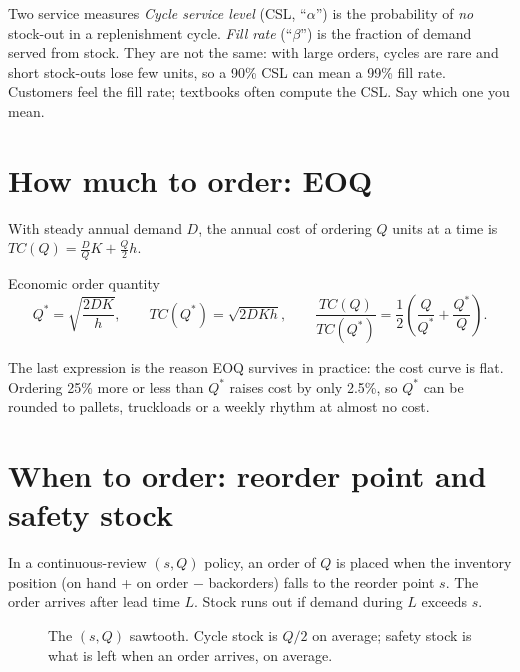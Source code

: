 \begin{definition}{Two service measures}
\emph{Cycle service level} (CSL, ``$\alpha$'') is the probability of \emph{no} stock-out in a replenishment cycle.
\emph{Fill rate} (``$\beta$'') is the fraction of demand served from stock. They are not the same: with large orders,
cycles are rare and short stock-outs lose few units, so a 90\% CSL can mean a 99\% fill rate. Customers feel the fill
rate; textbooks often compute the CSL. Say which one you mean.
\end{definition}

\section{How much to order: EOQ}
With steady annual demand $D$, the annual cost of ordering $Q$ units at a time is
$TC(Q)=\frac{D}{Q}K+\frac{Q}{2}h$.
\begin{keyformula}{Economic order quantity}
\[ Q^*=\sqrt{\frac{2DK}{h}},\qquad TC(Q^*)=\sqrt{2DKh},\qquad \frac{TC(Q)}{TC(Q^*)}=\frac12\left(\frac{Q}{Q^*}+\frac{Q^*}{Q}\right). \]
\end{keyformula}
The last expression is the reason EOQ survives in practice: the cost curve is flat. Ordering 25\% more or less than
$Q^*$ raises cost by only 2.5\%, so $Q^*$ can be rounded to pallets, truckloads or a weekly rhythm at almost no cost.

\section{When to order: reorder point and safety stock}
In a continuous-review $(s,Q)$ policy, an order of $Q$ is placed when the inventory position (on hand + on order $-$
backorders) falls to the reorder point $s$. The order arrives after lead time $L$. Stock runs out if demand during $L$
exceeds $s$.

\begin{figure}[H]
\centering
{}
\caption{The $(s,Q)$ sawtooth. Cycle stock is $Q/2$ on average; safety stock is what is left when an order arrives,
on average.}
\end{figure}

